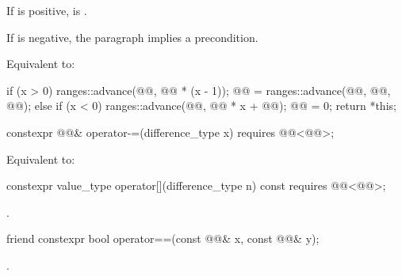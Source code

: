 \begin{itemdescr}
\pnum
\expects
If  is positive,
is .
\begin{note}
If  is negative, the  paragraph implies a precondition.
\end{note}

\pnum
\effects
Equivalent to:
\begin{codeblock}
if (x > 0) {
  ranges::advance(@@, @@ * (x - 1));
  @@ = ranges::advance(@@, @@, @@);
} else if (x < 0) {
  ranges::advance(@@, @@ * x + @@);
  @@ = 0;
}
return *this;
\end{codeblock}
\end{itemdescr}

%
\begin{itemdecl}
constexpr @@& operator-=(difference_type x)
  requires @@<@@>;
\end{itemdecl}

\begin{itemdescr}
\pnum
\effects
Equivalent to: 
\end{itemdescr}

%
\begin{itemdecl}
constexpr value_type operator[](difference_type n) const
  requires @@<@@>;
\end{itemdecl}

\begin{itemdescr}
\pnum
\returns
{}.
\end{itemdescr}

%
\begin{itemdecl}
friend constexpr bool operator==(const @@& x, const @@& y);
\end{itemdecl}

\begin{itemdescr}
\pnum
\returns
{}.
\end{itemdescr}

